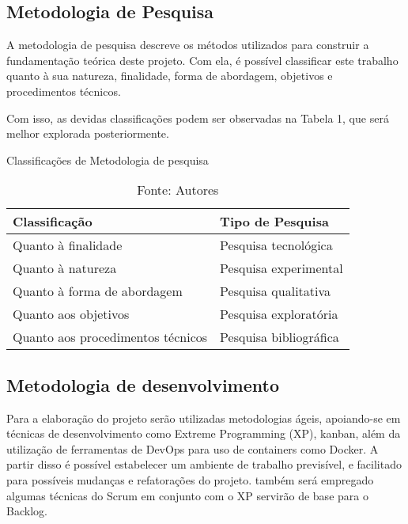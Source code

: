 \subsection{Metodologia de Pesquisa}

A metodologia de pesquisa descreve os métodos utilizados para construir a fundamentação teórica deste projeto. Com ela, é possível classificar este trabalho quanto à sua natureza, finalidade, forma de abordagem, objetivos e procedimentos técnicos.

Com isso, as devidas classificações podem ser observadas na Tabela 1, que será melhor explorada posteriormente.

\setlength{\extrarowheight}{5pt}

\begin{table}
    \centering
    \caption{Classificações de Metodologia de pesquisa}
    \begin{tabular}{|l|l|}
        \hline
        \textbf{Classificação}            & \textbf{Tipo de Pesquisa}\\ 
        \hline
        Quanto à finalidade               & Pesquisa tecnológica \\ 
        \hline
        Quanto à natureza                 & Pesquisa experimental \\ 
        \hline
        Quanto à forma de abordagem       & Pesquisa qualitativa \\
        \hline
        Quanto aos objetivos              & Pesquisa exploratória \\
        \hline
        Quanto aos procedimentos técnicos & Pesquisa bibliográfica \\
        \hline
    \end{tabular}
    \caption*{Fonte: Autores}
\end{table}


\subsection{Metodologia de desenvolvimento}

Para a elaboração do projeto serão utilizadas metodologias ágeis, apoiando-se em técnicas de desenvolvimento como Extreme Programming (XP), kanban, além da utilização de ferramentas de DevOps para uso de containers como Docker. A partir disso é possível estabelecer um ambiente de trabalho previsível, e facilitado para possíveis mudanças e refatorações do projeto. também será empregado algumas técnicas do Scrum em conjunto com o XP servirão de base para o Backlog.

